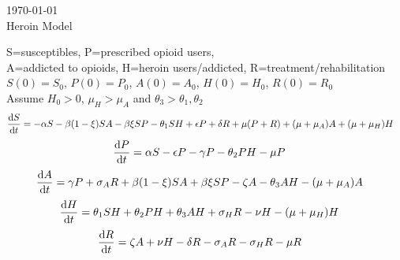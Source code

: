 \documentclass[12pt]{article}
\begin{document}

\today \\
Heroin Model 


S=susceptibles,
P=prescribed opioid users, \\
A=addicted to opioids, 
H=heroin users/addicted,
R=treatment/rehabilitation \\
$S(0)=S_{0}$, $P(0)=P_{0}$, $A(0)=A_{0}$, $H(0)=H_{0}$, $R(0)=R_{0}$ \\
Assume $H_{0}>0$, $\mu_{H} > \mu_{A}$ and $\theta_{3} > \theta_{1}, \theta_{2}$ 
\[\dv{S}{t} = -\alpha S - \beta (1- \xi) SA  -\beta \xi SP- \theta_{1} SH +\epsilon P +\delta R +\mu (P+R) + (\mu+\mu_{A})A + (\mu+\mu_{H}) H \quad\]
\[\dv{P}{t} = \alpha S - \epsilon P  - \gamma P - \theta_{2}PH- \mu P    \quad\]
\[\dv{A}{t} = \gamma P + \sigma_{A} R +\beta (1- \xi) SA  +\beta \xi SP -\zeta A - \theta_{3}AH-(\mu + \mu_{A})A   \quad\]
\[\dv{H}{t} = \theta_{1}SH+\theta_{2}PH+\theta_{3}AH + \sigma_{H}R-\nu H-(\mu+\mu_{H})H  \quad\]
\[\dv{R}{t} = \zeta A +\nu H -\delta R -\sigma_{A}R-\sigma_{H}R -\mu R\quad\]
\end{document}
